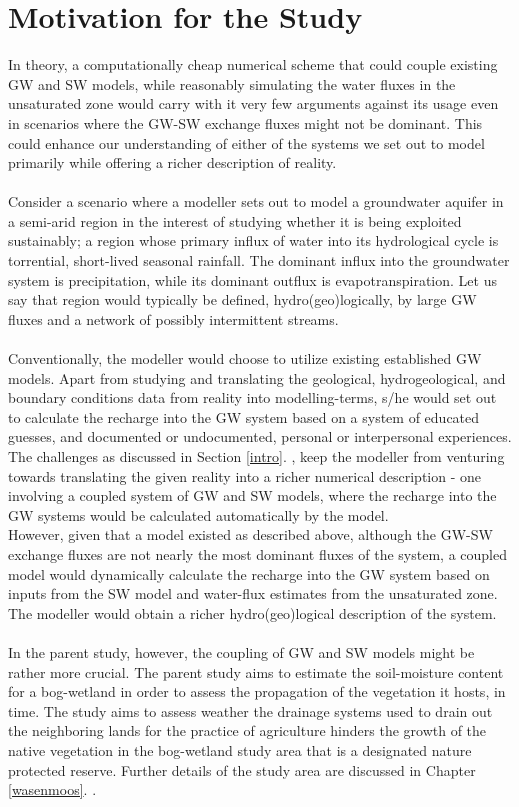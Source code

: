 \section{Motivation for the Study}  \label{motiv}
In theory, a computationally cheap numerical scheme that could couple existing GW and SW models, while reasonably simulating the water fluxes in the unsaturated zone would carry with it very few arguments against its usage even in scenarios where the GW-SW exchange fluxes might not be dominant. This could enhance our understanding of either of the systems we set out to model primarily while offering a richer description of reality.
\\ \\
Consider a scenario where a modeller sets out to model a groundwater aquifer in a semi-arid region in the interest of studying whether it is being exploited sustainably; a region whose primary influx of water into its hydrological cycle is torrential, short-lived seasonal rainfall. The dominant influx into the groundwater system is precipitation, while its dominant outflux is evapotranspiration.
Let us say that region would typically be defined, hydro(geo)logically, by large  GW fluxes and a network of possibly intermittent streams.
\\ \\
Conventionally, the modeller would choose to utilize existing established GW models. Apart from studying and translating the geological, hydrogeological, and boundary conditions data from reality into modelling-terms, s/he would set out to calculate the recharge into the GW system based on a system of educated guesses, and documented or undocumented, personal or interpersonal experiences. The challenges as discussed in Section \ref{intro}. , keep the modeller from venturing towards translating the given reality into a richer numerical description - one involving a coupled system of GW and SW models, where the recharge into the GW systems would be calculated automatically by the model.
\\
However, given that a model existed as described above, although the GW-SW exchange fluxes are not nearly the most dominant fluxes of the system, a coupled model would dynamically calculate the recharge into the GW system based on inputs from the SW model and water-flux estimates from the unsaturated zone. The modeller would obtain a richer hydro(geo)logical description of the system.
\\ \\
In the parent study, however, the coupling of GW and SW models might be rather more crucial. The parent study aims to estimate the soil-moisture content for a bog-wetland in order to assess the propagation of the vegetation it hosts, in time. The study aims to assess weather the drainage systems used to drain out the neighboring lands for the practice of agriculture hinders the growth of the native vegetation in the bog-wetland study area that is a designated nature protected reserve. Further details of the study area are discussed in Chapter \ref{wasenmoos}. .

